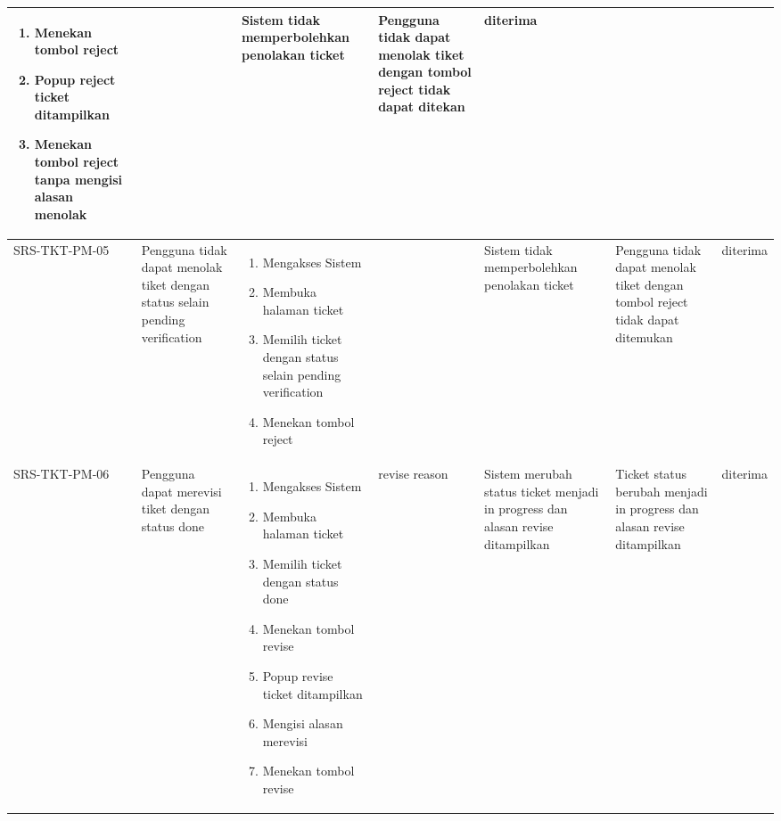 \documentclass[12pt]{article}
\begin{document}
\begin{enumerate}[label=\textbf{5.\arabic*.}]
\begin{enumerate}[label=\textbf{5.2.\arabic*.}]
\begin{landscape}
\begin{longtable}{ |l|p{}|p{}|p{}|p{}|p{}|l| }
\begin{enumerate}[label=\arabic*.]
                    \item Menekan tombol reject
                    \item Popup reject ticket ditampilkan
                    \item Menekan tombol reject tanpa mengisi alasan menolak
                \end{enumerate} 
                &  & Sistem tidak memperbolehkan penolakan ticket 
                & Pengguna tidak dapat menolak tiket dengan tombol reject tidak dapat ditekan & diterima \\
                \hline
                SRS-TKT-PM-05 & Pengguna tidak dapat menolak tiket dengan status selain pending verification & 
                \begin{enumerate}[label=\arabic*.] 
                    \item Mengakses Sistem
                    \item Membuka halaman ticket
                    \item Memilih ticket dengan status selain pending verification
                    \item Menekan tombol reject
                \end{enumerate} 
                &  & Sistem tidak memperbolehkan penolakan ticket 
                & Pengguna tidak dapat menolak tiket dengan tombol reject tidak dapat ditemukan & diterima \\
                \hline
                SRS-TKT-PM-06 & Pengguna dapat merevisi tiket dengan status done & 
                \begin{enumerate}[label=\arabic*.] 
                    \item Mengakses Sistem
                    \item Membuka halaman ticket
                    \item Memilih ticket dengan status done
                    \item Menekan tombol revise
                    \item Popup revise ticket ditampilkan
                    \item Mengisi alasan merevisi
                    \item Menekan tombol revise
                \end{enumerate} 
                & revise reason & Sistem merubah status ticket menjadi in progress dan alasan revise ditampilkan
                & Ticket status berubah menjadi in progress dan alasan revise ditampilkan& diterima \\

\end{longtable}
\end{landscape}
\end{enumerate}
\end{enumerate}
\end{document}
